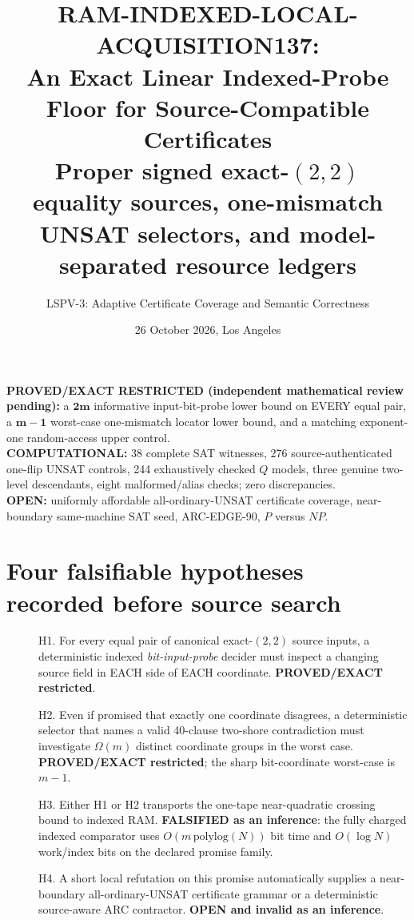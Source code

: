 \documentclass[11pt]{article}
\title{RAM-INDEXED-LOCAL-ACQUISITION137:\\
An Exact Linear Indexed-Probe Floor for Source-Compatible Certificates\\
\large Proper signed exact-$(2,2)$ equality sources, one-mismatch UNSAT selectors, and model-separated resource ledgers}
\author{LSPV-3: Adaptive Certificate Coverage and Semantic Correctness}
\date{26 October 2026, Los Angeles}
\begin{document}
\maketitle
\begin{center}
\textbf{PROVED/EXACT RESTRICTED (independent mathematical review pending):}
a $\boldsymbol{2m}$ informative input-bit-probe lower bound on EVERY equal pair,
a $\boldsymbol{m-1}$ worst-case one-mismatch locator lower bound,
and a matching exponent-one random-access upper control.\\
\textbf{COMPUTATIONAL:} 38 complete SAT witnesses, 276 source-authenticated one-flip
UNSAT controls, 244 exhaustively checked $Q$ models, three genuine two-level descendants,
eight malformed/alias checks; zero discrepancies.\\
\textbf{OPEN:} uniformly affordable all-ordinary-UNSAT certificate coverage,
near-boundary same-machine SAT seed, ARC-EDGE-90, $P$ versus $NP$.
\end{center}

\section{Four falsifiable hypotheses recorded before source search}
\begin{description}
\item[] H1. For every equal pair of canonical exact-$(2,2)$ source inputs,
a deterministic indexed \emph{bit-input-probe} decider must inspect a changing
source field in EACH side of EACH coordinate. \textbf{PROVED/EXACT restricted}.
\item[] H2. Even if promised that exactly one coordinate disagrees,
a deterministic selector that names a valid 40-clause two-shore contradiction
must investigate $\Omega(m)$ distinct coordinate groups in the worst case.
\textbf{PROVED/EXACT restricted}; the sharp bit-coordinate worst-case is $m-1$.
\item[] H3. Either H1 or H2 transports the one-tape near-quadratic crossing
bound to indexed RAM. \textbf{FALSIFIED as an inference}: the fully charged
indexed comparator uses $O(m\,\mathrm{polylog}(N))$ bit time and $O(\log N)$
work/index bits on the declared promise family.
\item[] H4. A short local refutation on this promise automatically supplies a
near-boundary all-ordinary-UNSAT certificate grammar or a deterministic
source-aware ARC contractor. \textbf{OPEN and invalid as an inference}.
\end{description}
\end{document}
